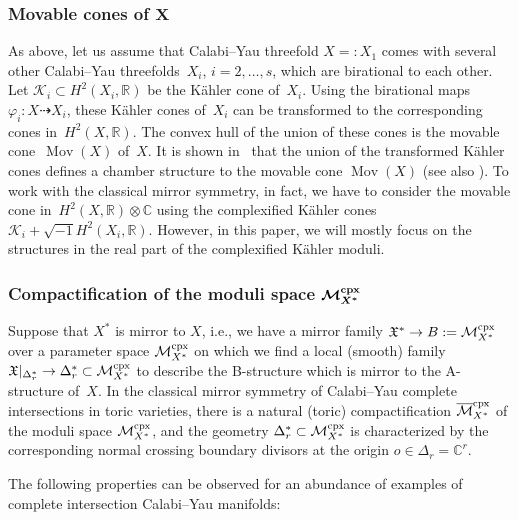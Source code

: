 \documentclass[pdftex]{sigma}
\numberwithin{equation}{section}
\begin{document}
\subsubsection[Movable cones of $X$]{Movable cones of $\boldsymbol{X}$} As above, let us assume that Calabi--Yau threefold $X=:X_{1}$ comes with several other Calabi--Yau threefolds~$X_{i}$, $i=2,\dots,s$, which are birational to each other. Let $\mathcal{K}_{i}\subset H^{2}(X_{i},\mathbb{R})$ be the K\"ahler cone of~$X_{i}$. Using the birational maps $\varphi_{i}\colon X\dashrightarrow X_{i}$, these K\"ahler cones of~$X_{i}$ can be transformed to the corresponding cones in~$H^{2}(X,\mathbb{R})$. The convex hull of the union of these cones is the movable cone~$\operatorname{Mov}(X)$ of~$X$. It is shown in~\cite{KawMovC} that the union of the transformed K\"ahler cones defines a chamber structure to the movable cone $\operatorname{Mov}(X)$ (see also \cite[Section~5]{MoKahler}). To work with the classical mirror symmetry, in fact, we have to consider the movable cone in~$H^{2}(X,\mathbb{R})\otimes\mathbb{C}$ using the complexified K\"ahler cones $\mathcal{K}_{i}+\sqrt{-1}H^{2}(X_{i},\mathbb{R})$. However, in this paper, we will mostly focus on the structures in the real part of the complexified K\"ahler moduli.

\subsubsection[Compactification of the moduli space ${\mathcal M}_{X^*}^{\rm cpx}$]{Compactification of the moduli space $\boldsymbol{{\mathcal M}_{X^*}^{\rm cpx}}$}\label{para:obs-path}

Suppose that $X^{*}$ is mirror to $X$, i.e., we have a mirror family $\mathfrak{X}^{*}\to B:=\mbox{\ensuremath{\mathcal{M}}}_{X^{*}}^{\rm cpx}$ over a parameter space $\mathcal{M}_{X^{*}}^{\rm cpx}$ on which we find a local (smooth) family $\mathfrak{X}|_{\Delta_{r}^{*}}\to\Delta_{r}^{*}\subset\mathcal{M}_{X^{*}}^{\rm cpx}$ to describe the B-structure which is mirror to the A-structure of~$X$. In the classical mirror symmetry of Calabi--Yau complete intersections in toric varieties, there is a natural (toric) compactification $\overline{\mathcal{M}}_{X^{*}}^{\rm cpx}$ \cite{hosCICY, HLY} of the moduli space $\mathcal{M}_{X^{*}}^{\rm cpx}$, and the geometry $\Delta_{r}^{*}\subset\mathcal{M}_{X^{*}}^{\rm cpx}$ is characterized by the corresponding normal crossing boundary divisors at the origin $o\in\Delta_{r}=\mathbb{C}^{r}$.

The following properties can be observed for an abundance of examples of complete intersection Calabi--Yau manifolds:
\end{document}
